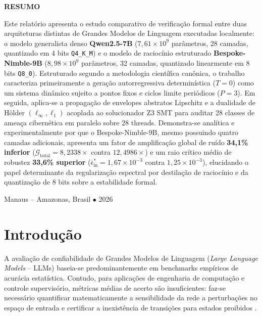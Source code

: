 \documentclass[11pt,a4paper]{article}
\theoremstyle{definition}
\begin{document}
\begin{titlepage}
    \vspace{0.7cm}
    \begin{minipage}{0.96\textwidth}
        \small
        \begin{center}\textbf{RESUMO}\end{center}
        \noindent Este relatório apresenta o estudo comparativo de verificação formal entre duas arquiteturas distintas de Grandes Modelos de Linguagem executadas localmente: o modelo generalista denso \textbf{Qwen2.5-7B} ($7{,}61 \times 10^9$ parâmetros, 28 camadas, quantizado em 4 bits \texttt{Q4\_K\_M}) e o modelo de raciocínio estruturado \textbf{Bespoke-Nimble-9B} ($8{,}98 \times 10^9$ parâmetros, 32 camadas, quantizado linearmente em 8 bits \texttt{Q8\_0}). Estruturado segundo a metodologia científica canônica, o trabalho caracteriza primeiramente a geração autorregressiva determinística ($T=0$) como um sistema dinâmico sujeito a pontos fixos e ciclos limite periódicos ($P=3$). Em seguida, aplica-se a propagação de envelopes abstratos Lipschitz e a dualidade de Hölder $(\ell_\infty, \ell_1)$ acoplada ao solucionador Z3 SMT para auditar 28 classes de ameaça cibernética em paralelo sobre 28 threads. Demonstra-se analítica e experimentalmente por que o Bespoke-Nimble-9B, mesmo possuindo quatro camadas adicionais, apresenta um fator de amplificação global de ruído \textbf{34,1\% inferior} ($\mathcal{G}_{\text{total}} = 8{,}2338\times$ contra $12{,}4986\times$) e um raio crítico médio de robustez \textbf{33,6\% superior} ($\bar{\epsilon}_{\text{in}}^* = 1{,}67 \times 10^{-3}$ contra $1{,}25 \times 10^{-3}$), elucidando o papel determinante da regularização espectral por destilação de raciocínio e da quantização de 8 bits sobre a estabilidade formal.
    \end{minipage}
    
    \vfill
    {\small Manaus -- Amazonas, Brasil $\bullet$ 2026 \par}
\end{titlepage}

\newpage
\tableofcontents
\newpage

\section{Introdução}

A avaliação de confiabilidade de Grandes Modelos de Linguagem (\textit{Large Language Models} -- LLMs) baseia-se predominantemente em benchmarks empíricos de acurácia estatística. Contudo, para aplicações de engenharia de computação e controle supervisório, métricas médias de acerto são insuficientes: faz-se necessário quantificar matematicamente a sensibilidade da rede a perturbações no espaço de entrada e certificar a inexistência de transições para estados proibidos \cite{cordeiro2012,gehr2018}.
\end{document}
